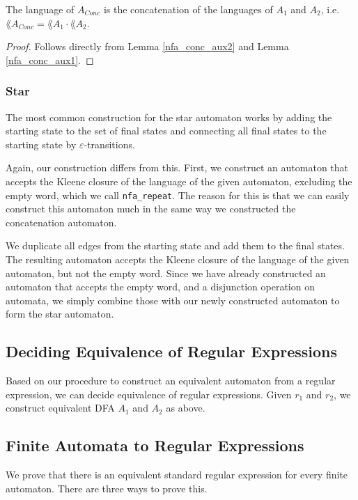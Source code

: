 \begin{corollary}
    The language of $A_{Conc}$ is the concatenation of the languages of $A_1$ and $A_2$, i.e. $\lang{A_{Conc}} = \lang{A_1} \cdot \lang{A_2}$.
\end{corollary}
\begin{proof}
    Follows directly from Lemma \ref{nfa_conc_aux2} and Lemma \ref{nfa_conc_aux1}. 
\end{proof}



\subsubsection{Star}
The most common construction for the star automaton works by adding the starting state
to the set of final states and connecting all final states to the starting state by $\varepsilon$-transitions.

Again, our construction differs from this.
First, we construct an automaton that accepts the Kleene closure of the language
of the given automaton, excluding the empty word, which we call \lstinline{nfa_repeat}.
The reason for this is that we can easily construct this automaton much in the same way
we constructed the concatenation automaton.

We duplicate all edges from the starting state and add them to the final states.
The resulting automaton accepts the Kleene closure of the language of the given automaton, but not the empty word.
Since we have already constructed an automaton that accepts the empty word, 
and a disjunction operation on automata, we simply combine those with our newly constructed automaton 
to form the star automaton.





\subsection{Deciding Equivalence of Regular Expressions}

 
Based on our procedure to construct an equivalent automaton from a regular expression, we can decide equivalence of regular expressions. Given $r_1$ and $r_2$, we construct equivalent DFA $A_1$ and $A_2$ as above.


\subsection{Finite Automata to Regular Expressions}
We prove that there is an equivalent standard regular expression for every finite automaton.
There are three ways to prove this. 


